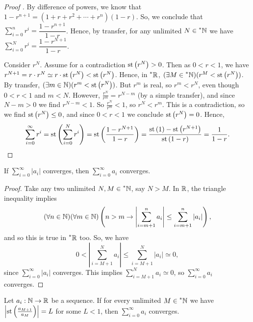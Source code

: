 \begin{proof}[Proof ]
    By difference of powers, we know that $1 - r^{n+1} = (1 + r + r^2 + \cdots + r^n)(1-r)$. So, we conclude that $\sum_{i=0}^n r^i = \dfrac{1-r^{n+1}}{1-r}$. Hence, by transfer, for any unlimited $N \in \prescript{*}{}{\mathbb{N}}$ we have $\sum_{i=0}^N r^i = \dfrac{1-r^{N+1}}{1-r}$. 

    Consider $r^{N}$. Assume for a contradiction $\operatorname{st}\left(r^N\right) > 0$. Then as $0 < r < 1$, we have $r^{N+1} = r \cdot r^N \simeq r\cdot \operatorname{st}\left(r^N\right) < \operatorname{st}\left(r^N\right)$. Hence, in $\prescript{*}{}{\mathbb{R}}$, $(\exists M \in \prescript{*}{}{\mathbb{N}})(r^M < \operatorname{st}\left(r^N\right))$. By transfer, $(\exists m \in \mathbb{N})(r^m < \operatorname{st}\left(r^N\right))$. But $r^m$ is real, so $r^m < r^N$, even though $0 < r < 1$ and $m < N$. However, $\frac{r^N}{r^m} = r^{N-m}$ (by a simple transfer), and since $N-m > 0$ we find $r^{N-m} < 1$. So $\frac{r^N}{r^m} < 1$, so $r^N < r^m$. This is a contradiction, so we find $\operatorname{st}\left(r^N\right) \leq 0$, and since $0 < r < 1$ we conclude $\operatorname{st}\left(r^N\right) = 0$. Hence, 
    \[\sum_{i=0}^\infty r^i = \operatorname{st}\left(\sum_{i=0}^N r^i\right) = \operatorname{st}\left(\frac{1-r^{N+1}}{1-r}\right) = \frac{\operatorname{st}\left(1\right) - \operatorname{st}\left(r^{N+1}\right)}{\operatorname{st}\left(1 - r\right)} = \frac{1}{1-r}. \]
\end{proof}

\begin{thm}\label{AbsoluteConvergenceImpliesConvergence}
    If $\sum_{i = 0}^\infty |a_i|$ converges, then $\sum_{i = 0}^\infty a_i$ converges.
\end{thm}

\begin{proof}
    Take any two unlimited $N, M \in \prescript{*}{}{\mathbb{N}}$, say $N > M$. In $\mathbb{R}$, the triangle inequality implies \[(\forall n \in \mathbb{N})(\forall m \in \mathbb{N})\left(n > m \to \left|\sum_{i = m + 1}^n a_i \right| \leq \sum_{i = m + 1}^n  |a_i|\right),\]
    and so this is true in $\prescript{*}{}{\mathbb{R}}$ too. So, we have 
    \[0 < \left|\sum_{i=M+1}^N a_i\right| \leq \sum_{i=M+1}^N |a_i| \simeq 0,\]
    since $\sum_{i=0}^\infty |a_i|$ converges. This implies $\sum_{i=M+1}^N a_i \simeq 0$, so $\sum_{i=0}^\infty a_i$ converges.
\end{proof}

\begin{thm}\label{RatioTest}
    Let $a_i: \mathbb{N} \to \mathbb{R}$ be a sequence. If for every unlimited $M \in \prescript{*}{}{\mathbb{N}}$ we have $\left|\operatorname{st}\left(\frac{a_{M+1}}{a_M}\right)\right| = L$ for some $L < 1$, then $\sum_{i=0}^\infty a_i$ converges.
\end{thm}

